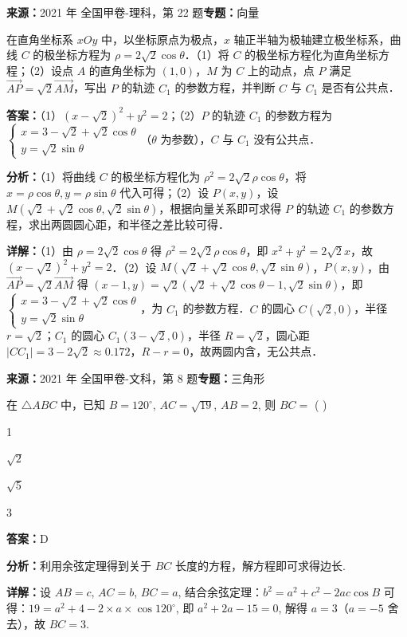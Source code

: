 \begin{question}[points=10]
\textbf{来源：}2021 年 全国甲卷-理科，第 22 题\quad \textbf{专题：}向量\par
在直角坐标系 $xOy$ 中，以坐标原点为极点，$x$ 轴正半轴为极轴建立极坐标系，曲线 $C$ 的极坐标方程为 $\rho = 2\sqrt{2}\cos\theta$．（1）将 $C$ 的极坐标方程化为直角坐标方程；（2）设点 $A$ 的直角坐标为 $(1,0)$，$M$ 为 $C$ 上的动点，点 $P$ 满足 $\overrightarrow{AP} = \sqrt{2}\overrightarrow{AM}$，写出 $P$ 的轨迹 $C_1$ 的参数方程，并判断 $C$ 与 $C_1$ 是否有公共点．
\begin{solution}
\textbf{答案：}（1）$(x-\sqrt{2})^2+y^2=2$；（2）$P$ 的轨迹 $C_1$ 的参数方程为 $\begin{cases} x = 3-\sqrt{2}+\sqrt{2}\cos\theta \\ y = \sqrt{2}\sin\theta \end{cases}$（$\theta$ 为参数），$C$ 与 $C_1$ 没有公共点．

\textbf{分析：}（1）将曲线 $C$ 的极坐标方程化为 $\rho^2 = 2\sqrt{2}\rho\cos\theta$，将 $x=\rho\cos\theta, y=\rho\sin\theta$ 代入可得；（2）设 $P(x,y)$，设 $M(\sqrt{2}+\sqrt{2}\cos\theta, \sqrt{2}\sin\theta)$，根据向量关系即可求得 $P$ 的轨迹 $C_1$ 的参数方程，求出两圆圆心距，和半径之差比较可得．

\textbf{详解：}（1）由 $\rho=2\sqrt{2}\cos\theta$ 得 $\rho^2=2\sqrt{2}\rho\cos\theta$，即 $x^2+y^2=2\sqrt{2}x$，故 $(x-\sqrt{2})^2+y^2=2$．（2）设 $M(\sqrt{2}+\sqrt{2}\cos\theta, \sqrt{2}\sin\theta)$，$P(x,y)$，由 $\overrightarrow{AP}=\sqrt{2}\overrightarrow{AM}$ 得 $(x-1,y)=\sqrt{2}(\sqrt{2}+\sqrt{2}\cos\theta-1, \sqrt{2}\sin\theta)$，即 $\begin{cases} x = 3-\sqrt{2}+\sqrt{2}\cos\theta \\ y = \sqrt{2}\sin\theta \end{cases}$，为 $C_1$ 的参数方程．$C$ 的圆心 $C(\sqrt{2},0)$，半径 $r=\sqrt{2}$；$C_1$ 的圆心 $C_1(3-\sqrt{2},0)$，半径 $R=\sqrt{2}$，圆心距 $|CC_1| = 3-2\sqrt{2} \approx 0.172$，$R-r = 0$，故两圆内含，无公共点．
\end{solution}
\end{question}

\begin{question}[points=5]
\textbf{来源：}2021 年 全国甲卷-文科，第 8 题\quad \textbf{专题：}三角形\par
在 $\triangle ABC$ 中，已知 $B=120^{\circ}$, $AC=\sqrt{19}$, $AB=2$, 则 $BC=$ ( )
\begin{choices}
  \item 1
  \item $\sqrt{2}$
  \item $\sqrt{5}$
  \item 3
\end{choices}
\begin{solution}
\textbf{答案：}D

\textbf{分析：}利用余弦定理得到关于 $BC$ 长度的方程，解方程即可求得边长.

\textbf{详解：}设 $AB=c$, $AC=b$, $BC=a$, 结合余弦定理：$b^2 = a^2 + c^2 - 2ac \cos B$ 可得：$19 = a^2 + 4 - 2 \times a \times \cos 120^{\circ}$, 即 $a^2 + 2a -15 = 0$, 解得 $a=3$（$a=-5$ 舍去），故 $BC=3$.
\end{solution}
\end{question}

